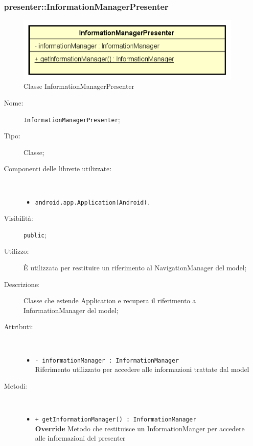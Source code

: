 \documentclass[../DefinizioneDiProdotto.tex]{subfiles}
\begin{document}
\subsubsection{presenter::InformationManagerPresenter}

    \begin{figure}[H]
        \centering
        \includegraphics{img/InformationManagerPresenter.png}
        \caption{Classe InformationManagerPresenter}\label{fig:presenter::InformationManagerPresenter} 
    \end{figure}
    \begin{description}
\item[Nome:] \texttt{InformationManagerPresenter};
\item[Tipo:] Classe;
\item[Componenti delle librerie utilizzate:] \
\begin{itemize}
\item \texttt{android.app.Application(Android)}.

\end{itemize}
\item[Visibilità:] \texttt{public};
\item[Utilizzo:] È utilizzata per restituire un riferimento al NavigationManager del model;
\item[Descrizione:] Classe che estende Application e recupera il riferimento a InformationManager del model;
\item[Attributi:] \
\begin{itemize}
\item \texttt{- informationManager : InformationManager}\\
Riferimento utilizzato per accedere alle informazioni trattate dal model

\end{itemize}
\item[Metodi:] \
\begin{itemize}
\item \texttt{+ getInformationManager() : InformationManager}\\
\textbf{Override} Metodo che restituisce un InformationManger per accedere alle informazioni del presenter
 \end{itemize}
\end{description}
\end{document}
